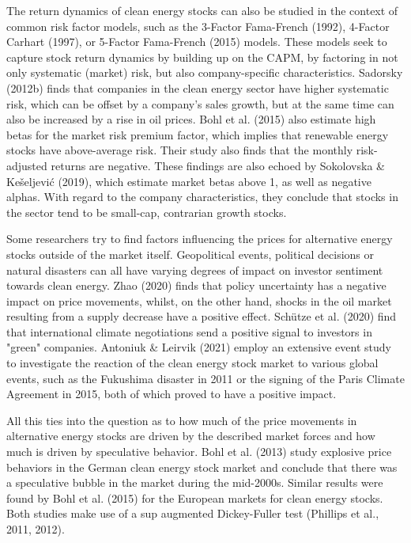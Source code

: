 \documentclass[11pt]{article}
\begin{document}
The return dynamics of clean energy stocks can also be studied in the context of common risk factor models, such as the 3-Factor Fama-French (1992), 4-Factor Carhart (1997), or 5-Factor Fama-French (2015) models. These models seek to capture stock return dynamics by building up on the CAPM, by factoring in not only systematic (market) risk, but also company-specific characteristics. Sadorsky (2012b) finds that companies in the clean energy sector have higher systematic risk, which can be offset by a company's sales growth, but at the same time can also be increased by a rise in oil prices. Bohl et al. (2015) also estimate high betas for the market risk premium factor, which implies that renewable energy stocks have above-average risk. Their study also finds that the monthly risk-adjusted returns are negative. These findings are also echoed by Sokolovska \& Kešeljević (2019), which estimate market betas above 1, as well as negative alphas. With regard to the company characteristics, they conclude that stocks in the sector tend to be small-cap, contrarian growth stocks.
\newline

Some researchers try to find factors influencing the prices for alternative energy stocks outside of the market itself. Geopolitical events, political decisions or natural disasters can all have varying degrees of impact on investor sentiment towards clean energy. Zhao (2020) finds that policy uncertainty has a negative impact on price movements, whilst, on the other hand, shocks in the oil market resulting from a supply decrease have a positive effect. Schütze et al. (2020) find that international climate negotiations send a positive signal to investors in "green" companies. Antoniuk \& Leirvik (2021) employ an extensive event study to investigate the reaction of the clean energy stock market to various global events, such as the Fukushima disaster in 2011 or the signing of the Paris Climate Agreement in 2015, both of which proved to have a positive impact.
\newline

All this ties into the question as to how much of the price movements in alternative energy stocks are driven by the described market forces and how much is driven by speculative behavior. Bohl et al. (2013) study explosive price behaviors in the German clean energy stock market and conclude that there was a speculative bubble in the market during the mid-2000s. Similar results were found by Bohl et al. (2015) for the European markets for clean energy stocks. Both studies make use of a sup augmented Dickey-Fuller test (Phillips et al., 2011, 2012).
\newline
\end{document}
